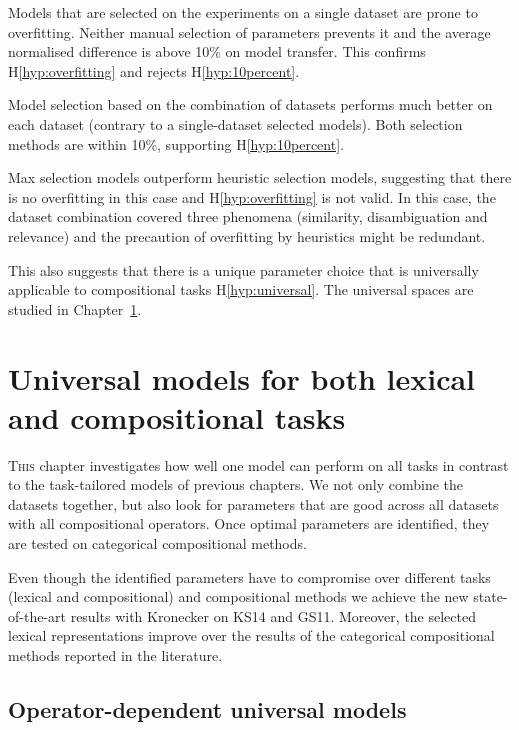 Models that are selected on the experiments on a single dataset are prone to overfitting. Neither manual selection of parameters prevents it and the average normalised difference is above 10\% on model transfer. This confirms H\ref{hyp:overfitting} and rejects H\ref{hyp:10percent}.

Model selection based on the combination of datasets performs much better on each dataset (contrary to a single-dataset selected models). Both selection methods are within 10\%, supporting H\ref{hyp:10percent}.

Max selection models outperform heuristic selection models, suggesting that there is no overfitting in this case and H\ref{hyp:overfitting} is not valid. In this case, the dataset combination covered three phenomena (similarity, disambiguation and relevance) and the precaution of overfitting by heuristics might be redundant.

This also suggests that there is a unique parameter choice that is universally applicable to compositional tasks H\ref{hyp:universal}. The universal spaces are studied in Chapter~\ref{sec:universal-param-selection}.

\chapter[Universal models]{Universal models for both lexical and compositional tasks}
\label{sec:universal-param-selection}

\lettrine[lines=5,loversize=0.25]{T}{his} chapter investigates how well one model can perform on all tasks in contrast to the task-tailored models of previous chapters.
We not only combine the datasets together, but also look for parameters that are good across all datasets with all compositional operators. Once optimal parameters are identified, they are tested on categorical compositional methods.

Even though the identified parameters have to compromise over different tasks (lexical and compositional) and compositional methods we achieve the new state-of-the-art results with Kronecker on KS14 and GS11. Moreover, the selected lexical representations improve over the results of the categorical compositional methods reported in the literature.

\section{Operator-dependent universal models}
\label{sec:model-selection}

